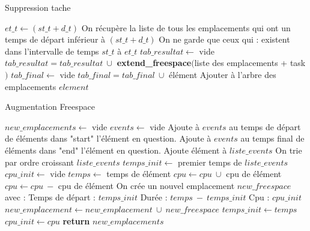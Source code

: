 \documentclass{report}
\begin{document}
\begin{algorithm}
\caption{Suppression tache}\label{Remove}
\begin{algorithmic}[1]
	\State $et\_t \gets (st\_t + d\_t)$
	\State
	\State On récupère la liste de tous les emplacements qui ont un temps de départ inférieur à $(st\_t + d\_t)$ 
	\State
	\State On ne garde que ceux qui :
		\State \hspace{\algorithmicindent} existent dans l'intervalle de temps $st\_t$ à $et\_t$
	\State
	\State $tab\_resultat \gets$ vide
	\State
	\State $tab\_resultat = tab\_resultat\ \cup$ \textbf{extend\_freespace}$($liste des emplacements + task$)$
	\State
	\State $tab\_final \gets $ vide
	\State
			\State $tab\_final = tab\_final\ \cup$ élément
		\EndIf
	\EndFor
	\State
		\State Ajouter à l'arbre des emplacements $element$
	\EndFor
	\State
\EndFunction
\end{algorithmic}
\end{algorithm}

\begin{algorithm}
\caption{Augmentation Freespace}\label{extend_freespace}
\begin{algorithmic}[1]
	\State $new\_emplacements \gets$ vide
	\State $events \gets$ vide
	\State
		\State Ajoute à $events$ au temps de départ de éléments dans "start" l'élément en question.
		\State Ajoute à $events$ au temps final de éléments dans "end" l'élément en question.
	\EndFor
	\State
		\State Ajoute élément à $liste\_events$	
	\EndFor
	\State
	\State On trie par ordre croissant $liste\_events$
	\State $temps\_init \gets$ premier temps de $liste\_events$
	\State $cpu\_init \gets$ vide
	\State
		\State $temps \gets$ temps de élément
			\State $cpu \gets cpu\ \cup$ cpu de élément
			\State $cpu \gets cpu\ -$ cpu de élément
		\EndIf
					\State On crée un nouvel emplacement $new\_freespace$ avec :
				\State \hspace{\algorithmicindent} Temps de départ : $temps\_init$
				\State \hspace{\algorithmicindent} Durée : $temps\ -\ temps\_init$
				\State \hspace{\algorithmicindent} Cpu : $cpu\_init$
			\State $new\_emplacement \gets new\_emplacement\ \cup\ new\_freespace$ 
			\State $temps\_init \gets temps$
		\EndIf
		\State $cpu\_init \gets cpu$
	\EndFor
	\State
	\State \textbf{return} $new\_emplacements$
\EndFunction
\end{algorithmic}
\end{algorithm}
\end{document}
